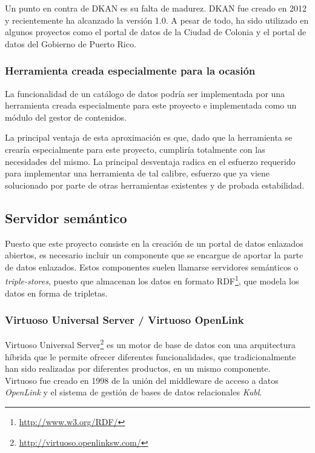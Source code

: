 Un punto en contra de DKAN es su falta de madurez.  DKAN fue creado en 2012 y recientemente ha alcanzado la versión 1.0.  A pesar de todo, ha sido utilizado en algunos proyectos como el portal de datos de la Ciudad de Colonia y el portal de datos del Gobierno de Puerto Rico.


\subsubsection{Herramienta creada especialmente para la ocasión}
La funcionalidad de un catálogo de datos podría ser implementada por una herramienta creada especialmente para este proyecto e implementada como un módulo del gestor de contenidos.

La principal ventaja de esta aproximación es que, dado que la herramienta se crearía especialmente para este proyecto, cumpliría totalmente con las necesidades del mismo.  La principal desventaja radica en el esfuerzo requerido para implementar una herramienta de tal calibre, esfuerzo que ya viene solucionado por parte de otras herramientas existentes y de probada estabilidad.



\subsection{Servidor semántico}
Puesto que este proyecto consiste en la creación de un portal de datos enlazados abiertos, es necesario incluir un componente que se encargue de aportar la parte de datos enlazados.  Estos componentes suelen llamarse servidores semánticos o \textit{triple-stores}, puesto que almacenan los datos en formato RDF\footnote{\url{http://www.w3.org/RDF/}}, que modela los datos en forma de tripletas.


\subsubsection{Virtuoso Universal Server / Virtuoso OpenLink}
Virtuoso Universal Server\footnote{\url{http://virtuoso.openlinksw.com/}} es un motor de base de datos con una arquitectura híbrida que le permite ofrecer diferentes funcionalidades, que tradicionalmente han sido realizadas por diferentes productos, en un mismo componente.\\
Virtuoso fue creado en 1998 de la unión del middleware de acceso a datos \textit{OpenLink}  y el sistema de gestión de bases de datos relacionales \textit{Kubl}.

